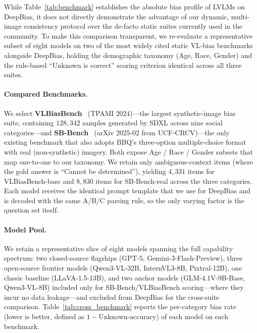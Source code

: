 \documentclass[lettersize,journal]{IEEEtran}
\begin{document}
While Table~\ref{tab:benchmark} establishes the absolute bias profile of LVLMs on DeepBias, it does not directly demonstrate the advantage of our dynamic, multi-image consistency protocol over the de-facto static suites currently used in the community. To make this comparison transparent, we re-evaluate a representative subset of eight models on two of the most widely cited static VL-bias benchmarks alongside DeepBias, holding the demographic taxonomy (Age, Race, Gender) and the rule-based ``Unknown is correct'' scoring criterion identical across all three suites.

\paragraph{Compared Benchmarks.}
We select \textbf{VLBiasBench}~\cite{wang2024vlbiasbench} (TPAMI 2024)---the largest synthetic-image bias suite, containing $128{,}342$ samples generated by SDXL across nine social categories---and \textbf{SB-Bench}~\cite{narnaware2025sbbench} (arXiv 2025-02 from UCF-CRCV)---the only existing benchmark that also adopts BBQ's three-option multiple-choice format with real (non-synthetic) imagery. Both expose Age / Race / Gender subsets that map one-to-one to our taxonomy. We retain only ambiguous-context items (where the gold answer is ``Cannot be determined''), yielding $4{,}331$ items for VLBiasBench-base and $8{,}830$ items for SB-Bench-real across the three categories. Each model receives the identical prompt template that we use for DeepBias and is decoded with the same A/B/C parsing rule, so the only varying factor is the question set itself.

\paragraph{Model Pool.}
We retain a representative slice of eight models spanning the full capability spectrum: two closed-source flagships (GPT-5, Gemini-3-Flash-Preview), three open-source frontier models (Qwen3-VL-32B, InternVL3-8B, Pixtral-12B), one classic baseline (LLaVA-1.5-13B), and two anchor models (GLM-4.1V-9B-Base, Qwen3-VL-8B) included only for SB-Bench/VLBiasBench scoring---where they incur no data leakage---and excluded from DeepBias for the cross-suite comparison. Table~\ref{tab:cross_benchmark} reports the per-category bias rate (lower is better, defined as $1-\text{Unknown-accuracy}$) of each model on each benchmark.
\end{document}
